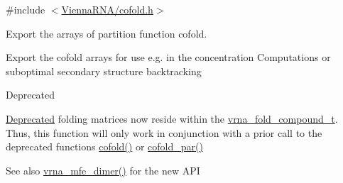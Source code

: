 {\ttfamily \#include $<$\hyperlink{cofold_8h}{Vienna\+R\+N\+A/cofold.\+h}$>$}



Export the arrays of partition function cofold. 

Export the cofold arrays for use e.\+g. in the concentration Computations or suboptimal secondary structure backtracking

\begin{DoxyRefDesc}{Deprecated}
\item[\hyperlink{deprecated__deprecated000036}{Deprecated}]folding matrices now reside within the \hyperlink{group__fold__compound_ga1b0cef17fd40466cef5968eaeeff6166}{vrna\+\_\+fold\+\_\+compound\+\_\+t}. Thus, this function will only work in conjunction with a prior call to the deprecated functions \hyperlink{group__mfe__global__deprecated_gabc8517f22cfe70595ee81fc837910d52}{cofold()} or \hyperlink{group__mfe__global__deprecated_ga7612cfeeb1b793f1e4179b1eb53df1f3}{cofold\+\_\+par()}\end{DoxyRefDesc}


\begin{DoxySeeAlso}{See also}
\hyperlink{group__mfe__global_gaab22d10c1190f205f16a77cab9d5d3ee}{vrna\+\_\+mfe\+\_\+dimer()} for the new A\+PI
\end{DoxySeeAlso}


